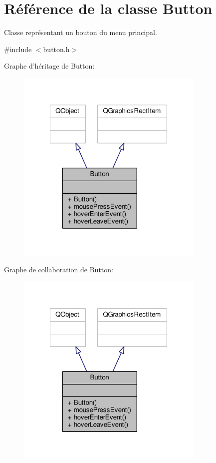 \hypertarget{classButton}{\section{Référence de la classe Button}
\label{classButton}
}


Classe représentant un bouton du menu principal.  




{\ttfamily \#include $<$button.\+h$>$}



Graphe d'héritage de Button\+:
\nopagebreak
\begin{figure}[H]
\begin{center}
\leavevmode
\includegraphics[width=255pt]{d5/dbb/classButton__inherit__graph}
\end{center}
\end{figure}


Graphe de collaboration de Button\+:
\nopagebreak
\begin{figure}[H]
\begin{center}
\leavevmode
\includegraphics[width=255pt]{d6/dbf/classButton__coll__graph}
\end{center}
\end{figure}
